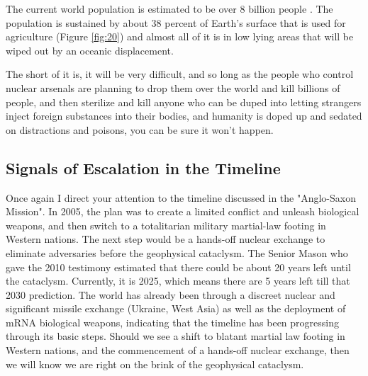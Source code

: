 \documentclass[10pt,twocolumn,letterpaper]{article}
\begin{document}
The current world population is estimated to be over 8 billion people \cite{47}. The population is sustained by about 38 percent of Earth's surface that is used for agriculture \cite{46} (Figure \ref{fig:20}) and almost all of it is in low lying areas that will be wiped out by an oceanic displacement. 

The short of it is, it will be very difficult, and so long as the people who control nuclear arsenals are planning to drop them over the world and kill billions of people, and then sterilize and kill anyone who can be duped into letting strangers inject foreign substances into their bodies, and humanity is doped up and sedated on distractions and poisons, you can be sure it won't happen.

\subsection{Signals of Escalation in the Timeline}

Once again I direct your attention to the timeline discussed in the "Anglo-Saxon Mission". In 2005, the plan was to create a limited conflict and unleash biological weapons, and then switch to a totalitarian military martial-law footing in Western nations. The next step would be a hands-off nuclear exchange to eliminate adversaries before the geophysical cataclysm. The Senior Mason who gave the 2010 testimony estimated that there could be about 20 years left until the cataclysm. Currently, it is 2025, which means there are 5 years left till that 2030 prediction. The world has already been through a discreet nuclear and significant missile exchange (Ukraine, West Asia) as well as the deployment of mRNA biological weapons, indicating that the timeline has been progressing through its basic steps. Should we see a shift to blatant martial law footing in Western nations, and the commencement of a hands-off nuclear exchange, then we will know we are right on the brink of the geophysical cataclysm.


\end{document}
